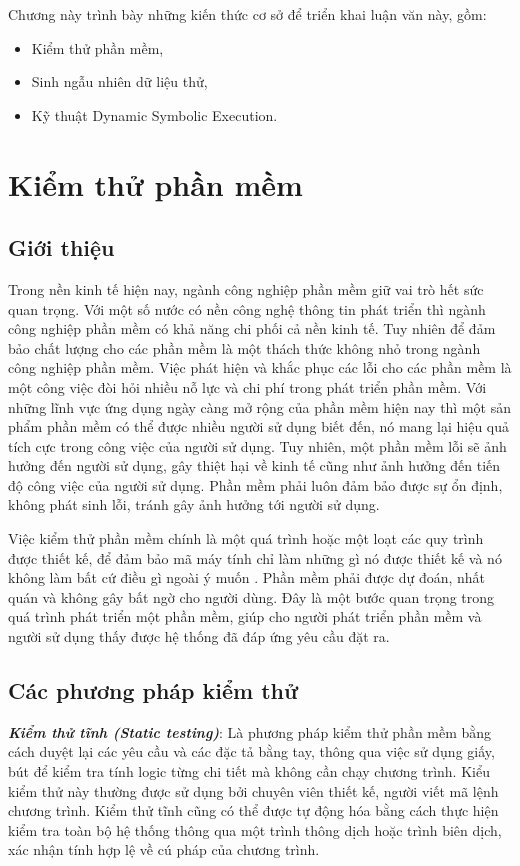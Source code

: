 Chương này trình bày những kiến thức cơ sở để triển khai luận văn này, gồm:
\begin{itemize}
\item Kiểm thử phần mềm,
\item Sinh ngẫu nhiên dữ liệu thử,
\item Kỹ thuật Dynamic Symbolic Execution.
\end{itemize}

\section{Kiểm thử phần mềm}

\cite{myers2011art,whittaker2000software,ammann2016introduction}

\subsection{Giới thiệu}
Trong nền kinh tế hiện nay, ngành công nghiệp phần mềm giữ vai trò hết sức quan trọng. Với một số nước có nền công nghệ thông tin phát triển thì ngành công nghiệp phần mềm có khả năng chi phối cả nền kinh tế. Tuy nhiên để đảm bảo chất lượng cho các phần mềm là một thách thức không nhỏ trong ngành công nghiệp phần mềm. Việc phát hiện và khắc phục các lỗi cho các phần mềm là một công việc đòi hỏi nhiều nỗ lực và chi phí trong phát triển phần mềm. Với những lĩnh vực ứng dụng ngày càng mở rộng của phần mềm hiện nay thì  một sản phẩm phần mềm có thể được nhiều người sử dụng biết đến, nó mang lại hiệu quả tích cực trong công việc của người sử dụng. Tuy nhiên, một phần mềm lỗi sẽ ảnh hưởng đến người sử dụng, gây thiệt hại về kinh tế cũng như ảnh hưởng đến tiến độ công việc của người sử dụng. Phần mềm phải luôn đảm bảo được sự ổn định, không phát sinh lỗi, tránh gây ảnh hưởng tới người sử dụng.

Việc kiểm thử phần mềm chính là một quá trình hoặc một loạt các quy trình được thiết kế, để đảm bảo mã máy tính chỉ làm những gì nó được thiết kế và nó không làm bất cứ điều gì ngoài ý muốn \cite{myers2011art}. Phần mềm phải được dự đoán, nhất quán và không gây bất ngờ cho người dùng. Đây là một bước quan trọng trong quá trình phát triển một phần mềm, giúp cho người phát triển phần mềm và người sử dụng thấy được hệ thống đã đáp ứng yêu cầu đặt ra.

\subsection{Các phương pháp kiểm thử}
\textbf{\textit{Kiểm thử tĩnh (Static testing)}}: Là phương pháp kiểm thử phần mềm bằng cách duyệt lại các yêu cầu và các đặc tả bằng tay, thông qua việc sử dụng giấy, bút để kiểm tra tính logic từng chi tiết mà không cần chạy chương trình. Kiểu kiểm thử này thường được sử dụng bởi chuyên viên thiết kế, người viết mã lệnh chương trình. Kiểm thử tĩnh cũng có thể được tự động hóa bằng cách thực hiện kiểm tra toàn bộ hệ thống thông qua một trình thông dịch hoặc trình biên dịch, xác nhận tính hợp lệ về cú pháp của chương trình.
		
